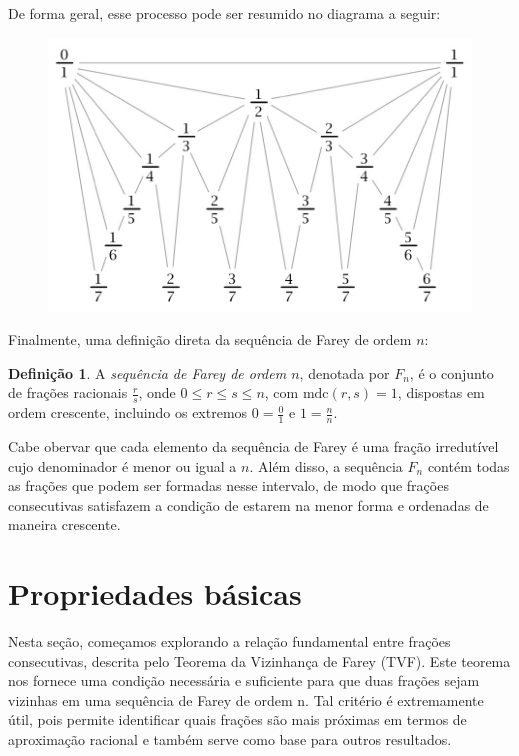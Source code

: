 \documentclass{hipatia}
\theoremstyle{definition} %
\newtheorem*{definition*}{Definição} %
\begin{document}
De forma geral, esse processo pode ser resumido no diagrama a seguir:

\begin{figure}[h]
    \centering
    \includegraphics[width=1\linewidth]{diagrama.jpeg}

\end{figure}



Finalmente, uma definição direta da sequência de Farey de ordem \( n \):

\begin{definition*}
    A \textit{sequência de Farey de ordem \( n \)}, denotada por \( F_n \), é o conjunto de frações racionais \(\frac{r}{s}\), onde \(0 \leq r \leq s \leq n\), com \(\text{mdc}(r, s) = 1\), dispostas em ordem crescente, incluindo os extremos \(0 = \frac{0}{1}\) e \(1 = \frac{n}{n}\). 
\end{definition*}
    Cabe obervar que cada elemento da sequência de Farey é uma fração irredutível cujo denominador é menor ou igual a \(n\). Além disso, a sequência \(F_n\) contém todas as frações que podem ser formadas nesse intervalo, de modo que frações consecutivas satisfazem a condição de estarem na menor forma e ordenadas de maneira crescente.


\section{Propriedades básicas}

Nesta seção, começamos explorando a relação fundamental entre frações consecutivas, descrita pelo Teorema da Vizinhança de Farey (TVF). Este teorema nos fornece uma condição necessária e suficiente para que duas frações sejam vizinhas em uma sequência de Farey de ordem n. Tal critério é extremamente útil, pois permite identificar quais frações são mais próximas em termos de aproximação racional e também serve como base para outros resultados.
\end{document}
